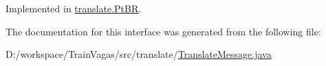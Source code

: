 Implemented in \hyperlink{classtranslate_1_1_pt_b_r_aa32cbf8602c41b8c6d61f19bc6c167dc}{translate.\+Pt\+BR}.



The documentation for this interface was generated from the following file\+:\begin{DoxyCompactItemize}
\item 
D\+:/workspace/\+Train\+Vagas/src/translate/\hyperlink{_translate_message_8java}{Translate\+Message.\+java}\end{DoxyCompactItemize}
